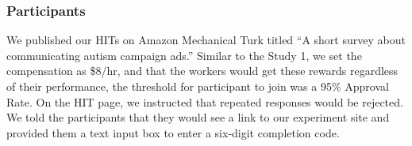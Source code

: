 
\subsubsection{Participants}
We published our HITs on Amazon Mechanical Turk titled ``A short survey about communicating autism campaign ads.'' Similar to the Study 1, we set the compensation as \$8/hr, and that the workers would get these rewards regardless of their performance, the threshold for participant to join was a 95\% Approval Rate. On the HIT page, we instructed that repeated responses would be rejected. We told the participants that they would see a link to our experiment site and provided them a text input box to enter a six-digit completion code.

